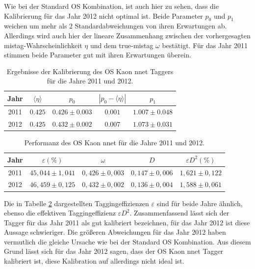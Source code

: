 Wie bei der Standard OS Kombination, ist auch hier zu sehen, dass die Kalibrierung für das Jahr \num{2012} nicht optimal ist. Beide Parameter $p_0$ und $p_1$ weichen um mehr als \num{2} Standardabweichungen von ihren Erwartungen ab. Allerdings wird auch hier der lineare Zusammenhang zwischen der vorhergesagten mistag-Wahrscheinlichkeit $\eta$ und dem true-mistag $\omega$ bestätigt. Für das Jahr \num{2011} stimmen beide Parameter gut mit ihren Erwartungen überein.  
\begin{table}[htbp]
	\centering
	\caption{Ergebnisse der Kalibrierung des OS Kaon nnet Taggers für die Jahre \num{2011} und \num{2012}.}
	\label{tab:result_OSKaonNN}
	\begin{tabular}{ccccc}
	\toprule
       Jahr & $\langle\eta\rangle$ & $p_0$ & $\left|p_0-\langle\eta\rangle\right|$ & $p_1$ \\ 
       \midrule 
	2011 & $0{.}425$ & $0{.}426\pm0{.}003$ & $0{.}001$ & $1{.}007\pm0{.}048$ \\
   2012 & $0{.}425$ & $0{.}432\pm0{.}002$ & $0{.}007$ & $1{.}073\pm0{.}031$ \\ 
   \bottomrule
	\end{tabular}
\end{table}
\begin{table}[htbp]
	\centering
	\caption{Performanz des OS Kaon nnet für die Jahre \num{2011} und \num{2012}.}
	\label{tab:performance_OSKaonNN}
	\begin{tabular}{ccccc}
	\toprule
       Jahr & $\varepsilon(\%)$ & $\omega$ & $D$ & $\varepsilon D^2(\%)$ \\ 
       \midrule
       2011 & $45{,}044\pm1{,}041$& $0{,}426\pm0{,}003$ & $0{,}147\pm0{,}006$ & $1{,}621\pm0{,}122$\\
     2012 & $46{,}459\pm0{,}125$& $0{,}432\pm0{,}002$ & $0{,}136\pm0{,}004$ & $1{,}588\pm0{,}061$\\ 
     \bottomrule
  \end{tabular}
\end{table}
Die in Tabelle \ref{tab:performance_OSKaonNN} dargestellten Taggingeffizienzen $\varepsilon$ sind für beide Jahre ähnlich, ebenso die effektiven Taggingeffizienz $\varepsilon D^2$. Zusammenfassend lässt sich der Tagger für das Jahr \num{2011} als gut kalibriert bezeichnen, für das Jahr \num{2012} ist diese Aussage schwieriger. Die größeren Abweichungen für das Jahr \num{2012} haben vermutlich die gleiche Ursache wie bei der Standard OS Kombination. Aus diesem Grund lässt sich für das Jahr \num{2012} sagen, dass der OS Kaon nnet Tagger kalibriert ist, diese Kalibration auf \BdToDpi allerdings nicht ideal ist.   

